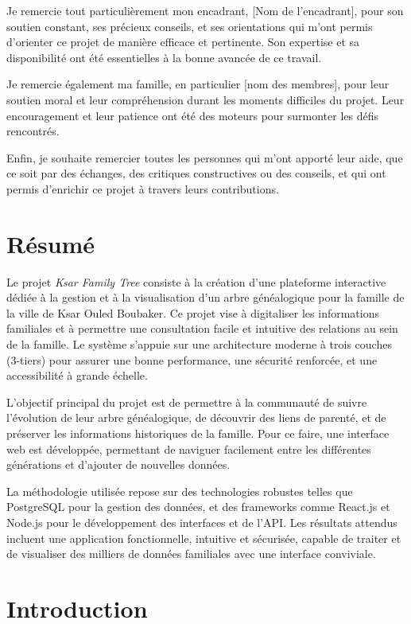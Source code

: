 \documentclass[a4paper,12pt]{report}
\begin{document}
	Je remercie tout particulièrement mon encadrant, [Nom de l'encadrant], pour son soutien constant, ses précieux conseils, et ses orientations qui m'ont permis d'orienter ce projet de manière efficace et pertinente. Son expertise et sa disponibilité ont été essentielles à la bonne avancée de ce travail.
	
	Je remercie également ma famille, en particulier [nom des membres], pour leur soutien moral et leur compréhension durant les moments difficiles du projet. Leur encouragement et leur patience ont été des moteurs pour surmonter les défis rencontrés.
	
	Enfin, je souhaite remercier toutes les personnes qui m’ont apporté leur aide, que ce soit par des échanges, des critiques constructives ou des conseils, et qui ont permis d'enrichir ce projet à travers leurs contributions.
	
	\chapter*{Résumé}
	
	Le projet \textit{Ksar Family Tree} consiste à la création d'une plateforme interactive dédiée à la gestion et à la visualisation d'un arbre généalogique pour la famille de la ville de Ksar Ouled Boubaker. Ce projet vise à digitaliser les informations familiales et à permettre une consultation facile et intuitive des relations au sein de la famille. Le système s’appuie sur une architecture moderne à trois couches (3-tiers) pour assurer une bonne performance, une sécurité renforcée, et une accessibilité à grande échelle.
	
	L'objectif principal du projet est de permettre à la communauté de suivre l’évolution de leur arbre généalogique, de découvrir des liens de parenté, et de préserver les informations historiques de la famille. Pour ce faire, une interface web est développée, permettant de naviguer facilement entre les différentes générations et d'ajouter de nouvelles données.
	
	La méthodologie utilisée repose sur des technologies robustes telles que PostgreSQL pour la gestion des données, et des frameworks comme React.js et Node.js pour le développement des interfaces et de l'API. Les résultats attendus incluent une application fonctionnelle, intuitive et sécurisée, capable de traiter et de visualiser des milliers de données familiales avec une interface conviviale.
	
	\newpage
	\chapter{Introduction}
\end{document}
